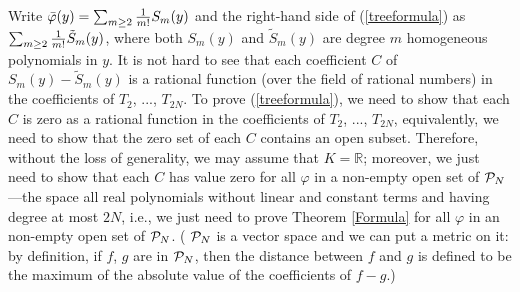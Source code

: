 \documentclass{article}
\newcommand{\bb}{\mathbb}
\newtheorem{main theorem}[defn]{Main Theorem}
\begin{document}
\vskip 10pt Write $\bar\varphi(y)=\sum_{m\ge 2} {1\over m!}S_m(y)$
and the right-hand side of (\ref{treeformula}) as $\sum_{m\ge 2}
{1\over m!}\tilde S_m(y)$, where both $S_m(y)$ and $\tilde S_m(y)$
are degree $m$ homogeneous polynomials in $y$. It is not hard to
see that each coefficient $C$ of $S_m(y)-\tilde S_m(y)$ is a
rational function (over the field of rational numbers) in the
coefficients of $T_2$, ..., $T_{2N}$. To prove
(\ref{treeformula}), we need to show that each $C$ is zero as a
rational function in the coefficients of $T_2$, ..., $T_{2N}$,
equivalently, we need to show that the zero set of each $C$
contains an open subset. Therefore, without the loss of
generality, we may assume that $K=\bb{R}$; moreover, we just need
to show that each $C$ has value zero for all $\varphi$ in a
non-empty open set of ${\cal P}_N$---the space all real
polynomials without linear and constant terms and having degree at
most $2N$, i.e., we just need to prove Theorem \ref{Formula} for
all $\varphi$ in an non-empty open set of ${\cal P}_N$. ( ${\cal
P}_N$ is a vector space and we can put a metric on it: by
definition, if $f$, $g$ are in ${\cal P}_N$, then the distance
between $f$ and $g$ is defined to be the maximum of the absolute
value of the coefficients of $f-g$.)
\end{document}
